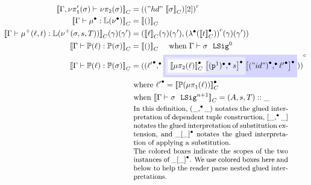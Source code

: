 \begin{align*}
  \denotesC{\goodType{\Gm, \lsigprojT{\lsig}}{\lsigproj{2}{\lsig}}{}} &= \Gmodel{("hd"~\denotesC{\lsig})[2]}\\
  \denotesC{\goodTerm{\Gm}{\LkgEmp}{\TyLkg{\LSigEmp}}} &= \denotesC{\unit} \\
  \denotesC{\goodTerm{\Gm}{\LkgAdd{\lkg}{t}}{\TyLkg{\LSigAdd{\lsig}{s}{T}}}}(\gm)(\gm') &= (\denotesC{\lkg}(\gm)(\gm') , \Gmodel{\Glam{\denotesCC{t}}}(\gm)(\gm')) \\
  \denotesC{\goodTerm{\Gm}{\Tkg{\lkg}}{\TyTkg{\lsig}}} &= \denotesC{\unit}
  \quad \text{ when \goodSig{\Gm}{\lsig}{0}} \\
  \denotesC{\goodTerm{\Gm}{\Tkg{\lkg}}{\TyTkg{\lsig}}} &= \Gmodel{\Gpair{\Glued{\ell'}}{
    \colorbox{blue!17}{\Gsub{
    \colorbox{blue!9}{\Gsub{
    \colorbox{blue!1}{\denotesCC{\lkgproj{2}{\lkg}}}
    }{\GSubstExt{{\GSubstWeak{1}}}{s}}}
    }{\GSubstExt{\Glued{("id")}}{ \Glued{\ell'} }}}
    }}
  \\ &\text{ where } \Glued{\ell'} = \denotesCC{\Tkg{\lkgproj{1}{\lkg}}} 
  \\ &\text{ when } \denotesC{\goodSig{\Gm}{\lsig}{n+1}} = (A, s, T)::\_
  \\ &{~\begin{minipage}{.58\textwidth}\small
    In this definition, $\Gpair{\_}{\_}$ notates the glued interpretation of
    dependent tuple construction, $[\GSubstExt{\_}{\_}]$ notates the glued
    interpretation of substitution extension, and $\Gsub{\_}{\_}$ notates the
    glued interpretation of applying a substitution.
    \\
    The colored boxes indicate the scopes of the two instances of $\Gsub{\_}{\_}$.
    We use colored boxes here and below to help the reader parse nested glued interpretations.
  \end{minipage}} \\[5pt]
%
%
%

\end{align*}
